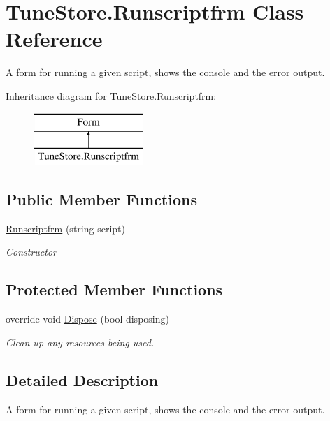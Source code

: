 \hypertarget{class_tune_store_1_1_runscriptfrm}{\section{Tune\+Store.\+Runscriptfrm Class Reference}
\label{class_tune_store_1_1_runscriptfrm}
}


A form for running a given script, shows the console and the error output.  


Inheritance diagram for Tune\+Store.\+Runscriptfrm\+:\begin{figure}[H]
\begin{center}
\leavevmode
\includegraphics[height=2.000000cm]{class_tune_store_1_1_runscriptfrm}
\end{center}
\end{figure}
\subsection*{Public Member Functions}
\begin{DoxyCompactItemize}
\item 
\hyperlink{class_tune_store_1_1_runscriptfrm_a8a5c24209522b82788714f4716c7c546}{Runscriptfrm} (string script)
\begin{DoxyCompactList}\small\item\em Constructor \end{DoxyCompactList}\end{DoxyCompactItemize}
\subsection*{Protected Member Functions}
\begin{DoxyCompactItemize}
\item 
override void \hyperlink{class_tune_store_1_1_runscriptfrm_a6ddba7aa56bf04fba48a4239a78831dc}{Dispose} (bool disposing)
\begin{DoxyCompactList}\small\item\em Clean up any resources being used. \end{DoxyCompactList}\end{DoxyCompactItemize}


\subsection{Detailed Description}
A form for running a given script, shows the console and the error output. 



